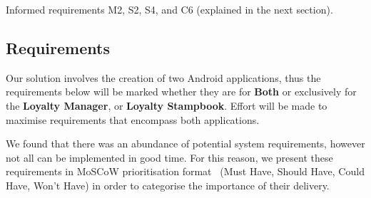 Informed requirements M2, S2, S4, and C6 (explained in the next section).

\clearpage{}

\subsection{Requirements}
Our solution involves the creation of two Android applications, thus the requirements below will be marked whether they are for \textbf{Both} or exclusively for the \textbf{Loyalty Manager}, or \textbf{Loyalty Stampbook}. Effort will be made to maximise requirements that encompass both applications.  

We found that there was an abundance of potential system requirements, however not all can be implemented in good time. For this reason, we present these requirements in MoSCoW prioritisation format~\cite{brennan2009guide} (Must Have, Should Have, Could Have, Won't Have) in order to categorise the importance of their delivery.

